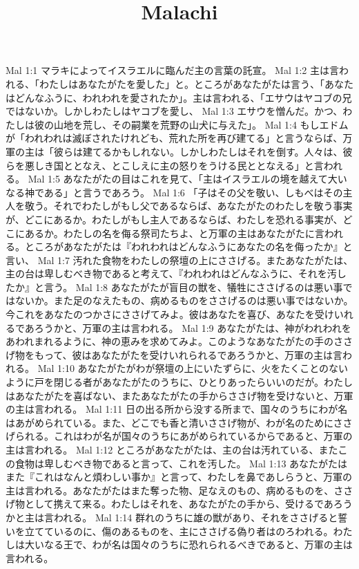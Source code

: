 

\title{Malachi}

Mal 1:1  マラキによってイスラエルに臨んだ主の言葉の託宣。
Mal 1:2  主は言われる、「わたしはあなたがたを愛した」と。ところがあなたがたは言う、「あなたはどんなふうに、われわれを愛されたか」。主は言われる、「エサウはヤコブの兄ではないか。しかしわたしはヤコブを愛し、
Mal 1:3  エサウを憎んだ。かつ、わたしは彼の山地を荒し、その嗣業を荒野の山犬に与えた」。
Mal 1:4  もしエドムが「われわれは滅ぼされたけれども、荒れた所を再び建てる」と言うならば、万軍の主は「彼らは建てるかもしれない。しかしわたしはそれを倒す。人々は、彼らを悪しき国ととなえ、とこしえに主の怒りをうける民ととなえる」と言われる。
Mal 1:5  あなたがたの目はこれを見て、「主はイスラエルの境を越えて大いなる神である」と言うであろう。
Mal 1:6  「子はその父を敬い、しもべはその主人を敬う。それでわたしがもし父であるならば、あなたがたのわたしを敬う事実が、どこにあるか。わたしがもし主人であるならば、わたしを恐れる事実が、どこにあるか。わたしの名を侮る祭司たちよ、と万軍の主はあなたがたに言われる。ところがあなたがたは『われわれはどんなふうにあなたの名を侮ったか』と言い、
Mal 1:7  汚れた食物をわたしの祭壇の上にささげる。またあなたがたは、主の台は卑しむべき物であると考えて、『われわれはどんなふうに、それを汚したか』と言う。
Mal 1:8  あなたがたが盲目の獣を、犠牲にささげるのは悪い事ではないか。また足のなえたもの、病めるものをささげるのは悪い事ではないか。今これをあなたのつかさにささげてみよ。彼はあなたを喜び、あなたを受けいれるであろうかと、万軍の主は言われる。
Mal 1:9  あなたがたは、神がわれわれをあわれまれるように、神の恵みを求めてみよ。このようなあなたがたの手のささげ物をもって、彼はあなたがたを受けいれられるであろうかと、万軍の主は言われる。
Mal 1:10  あなたがたがわが祭壇の上にいたずらに、火をたくことのないように戸を閉じる者があなたがたのうちに、ひとりあったらいいのだが。わたしはあなたがたを喜ばない、またあなたがたの手からささげ物を受けないと、万軍の主は言われる。
Mal 1:11  日の出る所から没する所まで、国々のうちにわが名はあがめられている。また、どこでも香と清いささげ物が、わが名のためにささげられる。これはわが名が国々のうちにあがめられているからであると、万軍の主は言われる。
Mal 1:12  ところがあなたがたは、主の台は汚れている、またこの食物は卑しむべき物であると言って、これを汚した。
Mal 1:13  あなたがたはまた『これはなんと煩わしい事か』と言って、わたしを鼻であしらうと、万軍の主は言われる。あなたがたはまた奪った物、足なえのもの、病めるものを、ささげ物として携えて来る。わたしはそれを、あなたがたの手から、受けるであろうかと主は言われる。
Mal 1:14  群れのうちに雄の獣があり、それをささげると誓いを立てているのに、傷のあるものを、主にささげる偽り者はのろわれる。わたしは大いなる王で、わが名は国々のうちに恐れられるべきであると、万軍の主は言われる。
